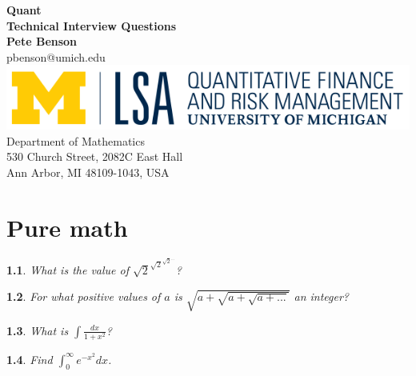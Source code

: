 \documentclass{report}
\newtheorem{problem}{}
\numberwithin{problem}{chapter} %
\newcommand{\ds}{\displaystyle}
\begin{document}
\begin{titlepage}
\begin{center}
 {\huge\bfseries Quant\\Technical Interview Questions\\}
 \vspace{1.5cm}
 {\bfseries Pete Benson}\\[5pt]
 pbenson@umich.edu\\[14pt]
 \vspace{10cm}
\includegraphics{QFRM_rgb}\\[5pt]
{Department of Mathematics}\\[5pt]
{530 Church Street, 2082C East Hall}\\[5pt]
{Ann Arbor, MI 48109-1043,
 USA}\\
 \vfill

\end{center}
\end{titlepage}

\tableofcontents
\newpage

\chapter{Pure math}

\begin{problem}
\cite{CRACK}
What is the value of $\sqrt{2}^{\sqrt{2}^{{\sqrt{2}^{...}}}}$?
\end{problem}

\begin{problem}
For what positive values of $a$ is $\sqrt{a +\sqrt{a +\sqrt{a +...}}}$  an integer?
\end{problem}

\begin{problem}
What is $\ds \int \frac{dx}{1+x^2}$?
\end{problem}

\begin{problem}
Find $\ds \int_0^\infty e^{-x^2}dx$.
\end{problem}
\end{document}

